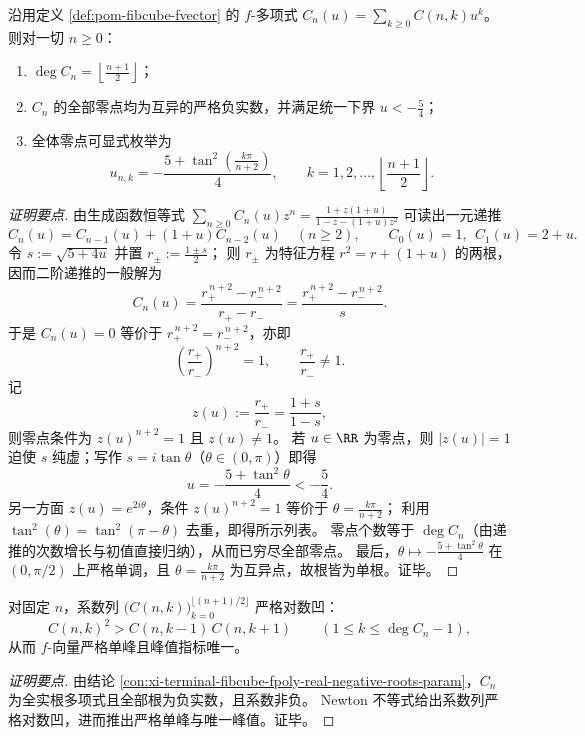 \begin{conclusion}\label{con:xi-terminal-fibcube-fpoly-real-negative-roots-param}
沿用定义 \ref{def:pom-fibcube-fvector} 的 \(f\)-多项式 \(C_n(u)=\sum_{k\ge 0}C(n,k)u^k\)。
则对一切 \(n\ge 0\)：
\begin{enumerate}
  \item \(\deg C_n=\left\lfloor\frac{n+1}{2}\right\rfloor\)；
  \item \(C_n\) 的全部零点均为互异的严格负实数，并满足统一下界 \(u<-\frac54\)；
  \item 全体零点可显式枚举为
  \[
  u_{n,k}=-\frac{5+\tan^2\!\left(\frac{k\pi}{n+2}\right)}{4},
  \qquad
  k=1,2,\dots,\left\lfloor\frac{n+1}{2}\right\rfloor.
  \]
\end{enumerate}
\end{conclusion}
\begin{proof}[证明要点]
由生成函数恒等式
\(
\sum_{n\ge 0}C_n(u)z^n=\frac{1+z(1+u)}{1-z-(1+u)z^2}
\)
可读出一元递推
\[
C_n(u)=C_{n-1}(u)+(1+u)C_{n-2}(u)\quad(n\ge 2),
\qquad
C_0(u)=1,\ \ C_1(u)=2+u.
\]
令 \(s:=\sqrt{5+4u}\) 并置
\(
r_\pm:=\frac{1\pm s}{2}
\)；
则 \(r_\pm\) 为特征方程 \(r^2=r+(1+u)\) 的两根，因而二阶递推的一般解为
\[
C_n(u)=\frac{r_+^{\,n+2}-r_-^{\,n+2}}{r_+-r_-}
  =\frac{r_+^{\,n+2}-r_-^{\,n+2}}{s}.
\]
于是 \(C_n(u)=0\) 等价于 \(r_+^{\,n+2}=r_-^{\,n+2}\)，亦即
\[
\left(\frac{r_+}{r_-}\right)^{n+2}=1,\qquad \frac{r_+}{r_-}\neq 1.
\]
记
\[
z(u):=\frac{r_+}{r_-}=\frac{1+s}{1-s},
\]
则零点条件为 \(z(u)^{n+2}=1\) 且 \(z(u)\neq 1\)。
若 \(u\in\RR\) 为零点，则 \(|z(u)|=1\) 迫使 \(s\) 纯虚；写作 \(s=i\tan\theta\)（\(\theta\in(0,\pi)\)）即得
\[
u=-\frac{5+\tan^2\theta}{4}<-\frac54.
\]
另一方面 \(z(u)=e^{2i\theta}\)，条件 \(z(u)^{n+2}=1\) 等价于 \(\theta=\frac{k\pi}{n+2}\)；
利用 \(\tan^2(\theta)=\tan^2(\pi-\theta)\) 去重，即得所示列表。
零点个数等于 \(\deg C_n\)（由递推的次数增长与初值直接归纳），从而已穷尽全部零点。
最后，\(\theta\mapsto -\frac{5+\tan^2\theta}{4}\) 在 \((0,\pi/2)\) 上严格单调，且 \(\theta=\frac{k\pi}{n+2}\) 为互异点，故根皆为单根。证毕。
\end{proof}

\begin{conclusion}[\(f\)-向量的严格对数凹与唯一峰值]\label{con:xi-terminal-fibcube-fvector-strict-logconcave-unimodal}
对固定 \(n\)，系数列 \(\bigl(C(n,k)\bigr)_{k=0}^{\lfloor (n+1)/2\rfloor}\) 严格对数凹：
\[
C(n,k)^2> C(n,k-1)\,C(n,k+1)
\qquad\left(1\le k\le \deg C_n-1\right),
\]
从而 \(f\)-向量严格单峰且峰值指标唯一。
\end{conclusion}
\begin{proof}[证明要点]
由结论 \ref{con:xi-terminal-fibcube-fpoly-real-negative-roots-param}，\(C_n\) 为全实根多项式且全部根为负实数，且系数非负。
Newton 不等式给出系数列严格对数凹，进而推出严格单峰与唯一峰值。证毕。
\end{proof}

